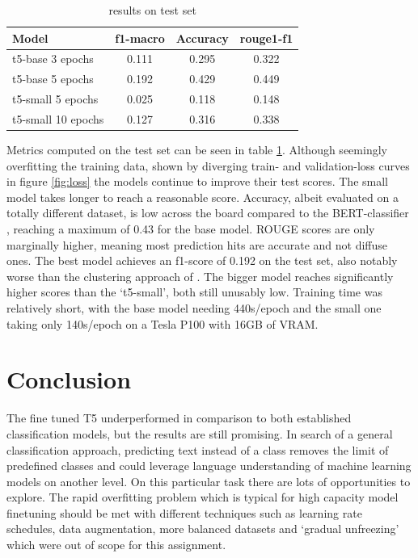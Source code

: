 \documentclass[11pt,a4paper,onecolumn,oneside,notitlepage]{article}
\begin{document}
		\begin{table}
			\begin{center}
				\begin{tabular}{|l|c|c|c|}
					\hline
                    \textbf{Model} & \textbf{f1-macro}  & \textbf{Accuracy} & \textbf{rouge1-f1}\\
					\hline
					\hline
					\hline
					t5-base 3 epochs & 0.111 & 0.295 & 0.322\\
                    \rowcolor{ForestGreen}
					t5-base 5 epochs & 0.192 & 0.429 & 0.449\\
					\hline
                    t5-small 5 epochs & 0.025 & 0.118 & 0.148\\
                    \hline
					t5-small 10 epochs & 0.127 & 0.316 & 0.338\\
					\hline
				\end{tabular}
			\end{center}
			
			\caption{results on test set}\label{tab1}
		\end{table}


Metrics computed on the test set can be seen in table \ref{tab1}. Although seemingly overfitting the training data, shown by diverging train- and validation-loss curves in figure \ref{fig:loss} the models continue to improve their test scores. The small model takes longer to reach a reasonable score. Accuracy, albeit evaluated on a totally different dataset, is low across the board compared to the BERT-classifier \citep{bert_frame_ident} , reaching  a maximum of 0.43 for the base model. ROUGE scores are only marginally higher, meaning most prediction hits are accurate and not diffuse ones.
The best model achieves an f1-score of 0.192 on the test set, also notably worse than the clustering approach of \citep{webis_task_paper}. The bigger model reaches significantly higher scores than the ‘t5-small’, both still unusably low. Training time was relatively short, with the base model needing 440s/epoch and the small one taking only 140s/epoch on a Tesla P100 with 16GB of VRAM.


\section{Conclusion}
The fine tuned T5 underperformed in comparison to both established classification models, but the results are still promising. In search of a general classification approach, predicting text instead of a class removes the limit of predefined classes and could leverage language understanding of machine learning models on another level. On this particular task there are lots of opportunities to explore. The rapid overfitting problem which is typical for high capacity model finetuning should be met with different techniques such as learning rate schedules, data augmentation, more balanced datasets and ‘gradual unfreezing’ which were out of scope for this assignment. \\
\end{document}
